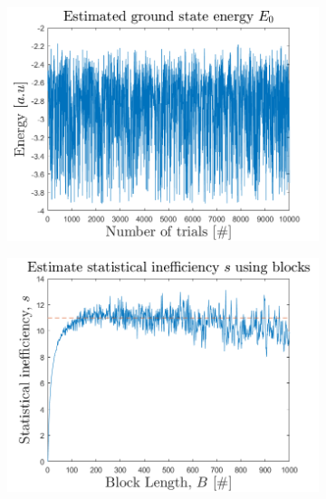 \begin{figure}[H]
	\centering
	\captionsetup[subfigure]{justification=centering}
	\begin{subfigure}[b]{0.48\textwidth}
		\centering
		\includegraphics[width=\textwidth]{graphics/task2/local_energy.png}
	\end{subfigure}
	\begin{subfigure}[b]{0.48\textwidth}
		\centering
		\includegraphics[width=\textwidth]{graphics/task2/block_error.png}
	\end{subfigure}
	\begin{subfigure}[b]{0.48\textwidth}
		\centering

\end{subfigure}
\end{figure}

